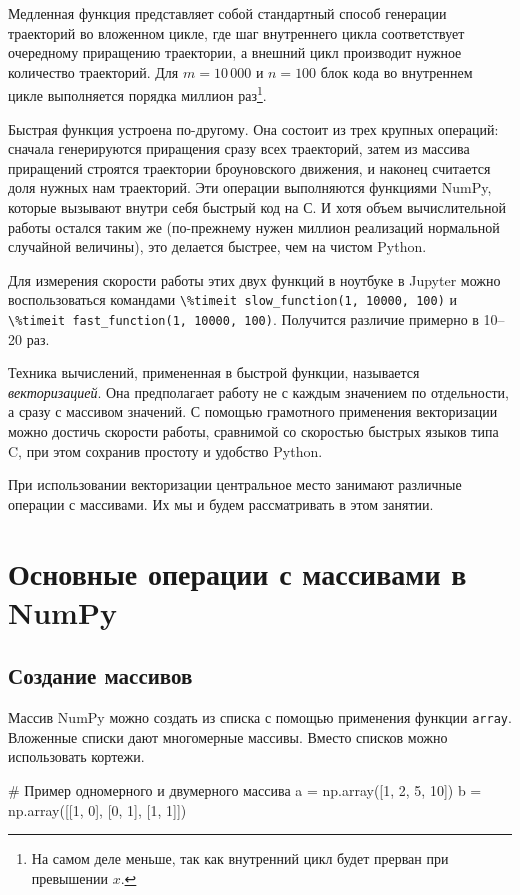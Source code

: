 Медленная функция представляет собой стандартный способ генерации траекторий во вложенном цикле, где шаг внутреннего цикла соответствует очередному приращению траектории, а внешний цикл производит нужное количество траекторий.
Для $m=10\,000$ и $n=100$ блок кода во внутреннем цикле выполняется порядка миллион раз\footnote{На самом деле меньше, так как внутренний цикл будет прерван при превышении $x$.}.

Быстрая функция устроена по-другому.
Она состоит из трех крупных операций: сначала генерируются приращения сразу всех траекторий, затем из массива приращений строятся траектории броуновского движения, и наконец считается доля нужных нам траекторий.
Эти операции выполняются функциями NumPy, которые вызывают внутри себя быстрый код на С.
И хотя объем вычислительной работы остался таким же (по-прежнему нужен миллион реализаций нормальной случайной величины), это делается быстрее, чем на чистом Python.

Для измерения скорости работы этих двух функций в ноутбуке в Jupyter можно воспользоваться командами \verb"\%timeit slow_function(1, 10000, 100)" и \verb"\%timeit fast_function(1, 10000, 100)".
Получится различие примерно в 10--20 раз.

Техника вычислений, примененная в быстрой функции, называется \emph{векторизацией}.
Она предполагает работу не с каждым значением по отдельности, а сразу с массивом значений.
С помощью грамотного применения векторизации можно достичь скорости работы, сравнимой со скоростью быстрых языков типа C, при этом сохранив простоту и удобство Python.

При использовании векторизации центральное место занимают различные операции с массивами.
Их мы и будем рассматривать в этом занятии.


\section{Основные операции с массивами в NumPy}

\subsection{Создание массивов}
Массив NumPy можно создать из списка с помощью применения функции \verb"array".
Вложенные списки дают многомерные массивы.
Вместо списков можно использовать кортежи.
\begin{python}
# Пример одномерного и двумерного массива
a = np.array([1, 2, 5, 10])
b = np.array([[1, 0], [0, 1], [1, 1]])
\end{python}

